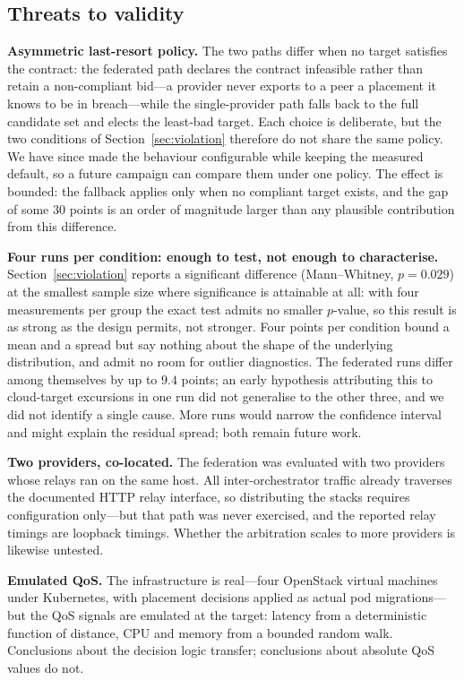 \documentclass[conference]{IEEEtran}
\begin{document}
\subsection{Threats to validity}
\label{sec:threats}

\textbf{Asymmetric last-resort policy.} The two paths differ when no target
satisfies the contract: the federated path declares the contract infeasible
rather than retain a non-compliant bid---a provider never exports to a peer a
placement it knows to be in breach---while the single-provider path falls
back to the full candidate set and elects the least-bad target. Each choice
is deliberate, but the two conditions of Section~\ref{sec:violation}
therefore do not share the same policy. We have since made the behaviour
configurable while keeping the measured default, so a future campaign can
compare them under one policy. The effect is bounded: the fallback applies
only when no compliant target exists, and the gap of some $30$ points is an
order of magnitude larger than any plausible contribution from this
difference.

\textbf{Four runs per condition: enough to test, not enough to characterise.}
Section~\ref{sec:violation} reports a significant difference (Mann--Whitney,
$p=0.029$) at the smallest sample size where significance is attainable at
all: with four measurements per group the exact test admits no smaller
$p$-value, so this result is as strong as the design permits, not stronger.
Four points per condition bound a mean and a spread but say nothing about the
shape of the underlying distribution, and admit no room for outlier
diagnostics. The federated runs differ among themselves by up to $9.4$
points; an early hypothesis attributing this to cloud-target excursions in
one run did not generalise to the other three, and we did not identify a
single cause. More runs would narrow the confidence interval and might
explain the residual spread; both remain future work.

\textbf{Two providers, co-located.} The federation was evaluated with two
providers whose relays ran on the same host. All inter-orchestrator traffic
already traverses the documented HTTP relay interface, so distributing the
stacks requires configuration only---but that path was never exercised, and
the reported relay timings are loopback timings. Whether the arbitration
scales to more providers is likewise untested.

\textbf{Emulated QoS.} The infrastructure is real---four OpenStack virtual
machines under Kubernetes, with placement decisions applied as actual pod
migrations---but the QoS signals are emulated at the target: latency from a
deterministic function of distance, CPU and memory from a bounded random
walk. Conclusions about the decision logic transfer; conclusions about
absolute QoS values do not.
\end{document}
